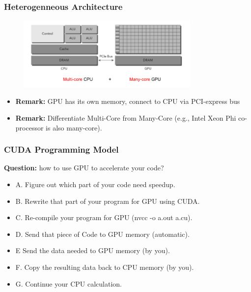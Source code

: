 \documentclass[xcolor={x11names,svgnames,dvipsnames}]{beamer}
\begin{document}
\begin{frame}
\frametitle{Heterogenneous Architecture}
 \begin{figure}
     \includegraphics[width=0.8\textwidth, height=0.5\textheight]{gpu_architecture.png}
\end{figure}

\begin{itemize}
\item
\textbf{Remark:} GPU has its own memory, connect to CPU via PCI-express
bus
\item \textbf{Remark:} Differentiate Multi-Core from Many-Core (e.g., Intel Xeon Phi
co-processor is also many-core).

\end{itemize}

\end{frame}


\begin{frame}
\frametitle{CUDA Programming Model}
\textbf{Question:} how to use GPU to accelerate your code?
\begin{itemize}
\item A. Figure out which part of your code need speedup.
\item B. Rewrite that part of your program for GPU using CUDA.
\item C. Re-compile your program for GPU (nvcc -o a.out a.cu).
\item D. Send that piece of Code to GPU memory (automatic).
\item E Send the data needed to GPU memory (by you).
\item F. Copy the resulting data back to CPU memory (by you).
\item G. Continue your CPU calculation.

\end{itemize}

\end{frame}
\end{document}
